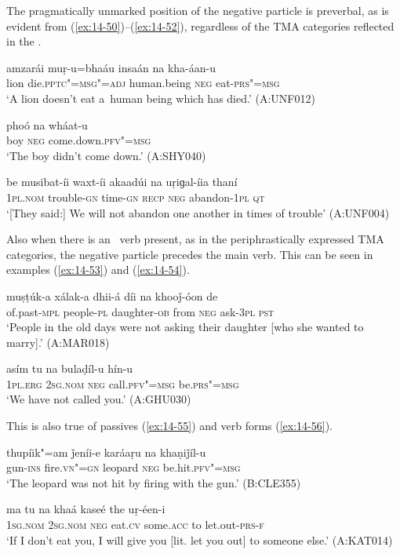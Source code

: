 The pragmatically unmarked position of the negative particle is preverbal, as is evident from (\ref{ex:14-50})--(\ref{ex:14-52}), regardless of the TMA categories reflected in the .

\begin{exe}
\ex
\label{ex:14-50}
\gll amzarái muṛ-u=bhaáu insaán na kha-áan-u \\
lion die.\textsc{pptc"=msg"=adj} human.being \textsc{neg} eat-\textsc{prs"=msg} \\
\glt `A lion doesn't eat a~human being which has died.' (A:UNF012)

\ex
\label{ex:14-51}
\gll phoó na wháat-u \\
boy \textsc{neg} come.down.\textsc{pfv"=msg } \\
\glt `The boy didn't come down.' (A:SHY040)

\ex
\label{ex:14-52}
\gll be musibat-íi waxt-íi akaadúi na uṛiɡal-íia  thaní \\
\textsc{1pl.nom} trouble-\textsc{gn} time-\textsc{gn} \textsc{recp} \textsc{neg} abandon-\textsc{1pl} \textsc{qt} \\
\glt `[They said:] We will not abandon one another in times of trouble' (A:UNF004)
\end{exe}

Also when there is an~ verb present, as in the periphrastically expressed TMA categories, the negative particle precedes the main verb. This can be seen in examples (\ref{ex:14-53}) and (\ref{ex:14-54}).

\begin{exe}
\ex
\label{ex:14-53}
\gll muṣṭúk-a xálak-a dhii-á díi na  khooǰ-óon de \\
of.past-\textsc{mpl} people-\textsc{pl} daughter-\textsc{ob} from \textsc{neg} ask-\textsc{3pl} \textsc{pst}  \\
\glt `People in the old days were not asking their daughter [who she wanted to marry].' (A:MAR018)

\ex
\label{ex:14-54}
\gll asím tu na bulaḍíl-u hín-u \\
\textsc{1pl.erg} \textsc{2sg.nom} \textsc{neg} call.\textsc{pfv"=msg} be.\textsc{prs"=msg} \\
\glt `We have not called you.' (A:GHU030)
\end{exe}

This is also true of passives (\ref{ex:14-55}) and  verb forms (\ref{ex:14-56}).

\begin{exe}
\ex
\label{ex:14-55}
\gll thupíik"=am ǰeníi-e karáaṛu na khaṇiǰíl-u \\
gun-\textsc{ins} fire.\textsc{vn"=gn} leopard \textsc{neg} be.hit.\textsc{pfv"=msg}  \\
\glt `The leopard was not hit by firing with the gun.' (B:CLE355)

\ex
\label{ex:14-56}
\gll ma tu na khaá kaseé  the uṛ-éen-i \\
\textsc{1sg.nom} \textsc{2sg.nom} \textsc{neg} eat.\textsc{cv} some.\textsc{acc} to let.out-\textsc{prs-f} \\
\glt `If I don't eat you, I will give you [lit. let you out] to someone else.' (A:KAT014)
\end{exe}


